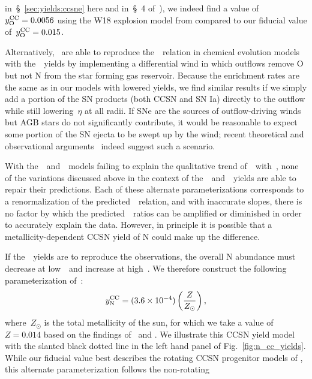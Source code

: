 \documentclass[ms.tex]{subfiles}
\begin{document}
in~\S~\ref{sec:yields:ccsne} here and in~\S~4 of~\citealp{Griffith2021a}), we
indeed find a value of~$y_\text{O}^\text{CC} = 0.0056$ using the W18 explosion model from
\citet{Sukhbold2016} compared to our fiducial value of~$y_\text{O}^\text{CC} = 0.015$.
\par
Alternatively,~\citet{Vincenzo2016a} are able to reproduce the~\ohno~relation
in chemical evolution models with the~\ventura~yields by implementing a
differential wind in which outflows remove O but not N from the star forming
gas reservoir.
Because the enrichment rates are the same as in our models with lowered
yields, we find similar results if we simply add a portion of the SN products
(both CCSN and SN Ia) directly to the outflow while still lowering~$\eta$ at
all radii.
If SNe are the sources of outflow-driving winds but AGB stars do not
significantly contribute, it would be reasonable to expect some portion of
the SN ejecta to be swept up by the wind; recent theoretical
\citep{Christensen2018} and observational arguments~\citep*{Chisholm2018}
indeed suggest such a scenario.
\par
With the~\karakasten~and~\karakas~models failing to explain the qualitative
trend of~\no~with~\oh, none of the variations discussed above in the
context of the~\cristallo~and~\ventura~yields are able to repair their
predictions.
Each of these alternate parameterizations corresponds to a renormalization of
the predicted~\ohno~relation, and with inaccurate slopes, there is no factor by
which the predicted~\no~ratios can be amplified or diminished in order to
accurately explain the data.
However, in principle it is possible that a metallicity-dependent CCSN yield
of N could make up the difference.
\par
If the~\karakasten~yields are to reproduce the observations, the overall N
abundance must decrease at low~\oh~and increase at high~\oh.
We therefore construct the following parameterization of~:
\begin{equation}
y_\text{N}^\text{CC} = (3.6\times10^{-4})\left(\frac{Z}{Z_\odot}\right),
\label{eq:linear_yncc}
\end{equation}
where~$Z_\odot$ is the total metallicity of the sun, for which we take a value
of~$Z = 0.014$ based on the findings of~\citet{Asplund2009} and
\citet*{Asplund2021}.
We illustrate this CCSN yield model with the slanted black dotted line in the
left hand panel of Fig.~\ref{fig:n_cc_yields}.
While our fiducial value best describes the rotating CCSN progenitor models of
\citet{Limongi2018}, this alternate parameterization follows the non-rotating
\end{document}
